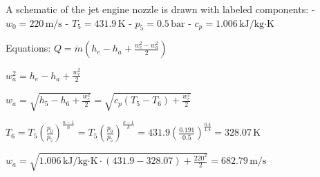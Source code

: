 A schematic of the jet engine nozzle is drawn with labeled components:  
- \( w_0 = 220 \, \text{m/s} \)  
- \( T_5 = 431.9 \, \text{K} \)  
- \( p_5 = 0.5 \, \text{bar} \)  
- \( c_p = 1.006 \, \text{kJ/kg·K} \)  

Equations:  
\( Q = \dot{m} (h_e - h_a + \frac{w_e^2 - w_a^2}{2}) \)  

\( w_a^2 = h_e - h_a + \frac{w_e^2}{2} \)  

\( w_a = \sqrt{h_5 - h_6 + \frac{w_e^2}{2}} = \sqrt{c_p (T_5 - T_6) + \frac{w_e^2}{2}} \)  

\( T_6 = T_5 \left( \frac{p_0}{p_5} \right)^{\frac{n-1}{n}} = T_5 \left( \frac{p_0}{p_5} \right)^{\frac{k-1}{k}} = 431.9 \left( \frac{0.191}{0.5} \right)^{\frac{0.4}{1.4}} = 328.07 \, \text{K} \)  

\( w_a = \sqrt{1.006 \, \text{kJ/kg·K} \cdot (431.9 - 328.07) + \frac{220^2}{2}} = 682.79 \, \text{m/s} \)